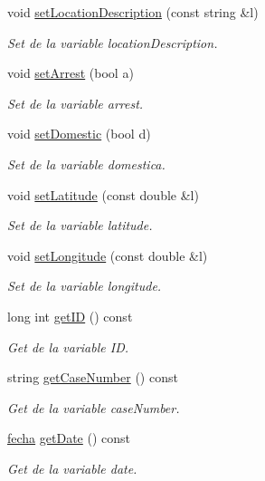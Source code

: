 \begin{DoxyCompactItemize}
void \hyperlink{classcrimen_a83703b5f245751410a3ffafb9f7065c0}{set\-Location\-Description} (const string \&l)
\begin{DoxyCompactList}\small\item\em Set de la variable location\-Description. \end{DoxyCompactList}\item 
void \hyperlink{classcrimen_ae08b85470038469179a01ba753b7641a}{set\-Arrest} (bool a)
\begin{DoxyCompactList}\small\item\em Set de la variable arrest. \end{DoxyCompactList}\item 
void \hyperlink{classcrimen_a3ec14cf4bb0464350d8efd98d2679d41}{set\-Domestic} (bool d)
\begin{DoxyCompactList}\small\item\em Set de la variable domestica. \end{DoxyCompactList}\item 
void \hyperlink{classcrimen_aff1f4343bad1957f290ea25df45878fa}{set\-Latitude} (const double \&l)
\begin{DoxyCompactList}\small\item\em Set de la variable latitude. \end{DoxyCompactList}\item 
void \hyperlink{classcrimen_ab150b316a5f17058f817e3e8908ad821}{set\-Longitude} (const double \&l)
\begin{DoxyCompactList}\small\item\em Set de la variable longitude. \end{DoxyCompactList}\item 
long int \hyperlink{classcrimen_a855eab30a304a6498828cb5d85a4e0e3}{get\-I\-D} () const 
\begin{DoxyCompactList}\small\item\em Get de la variable I\-D. \end{DoxyCompactList}\item 
string \hyperlink{classcrimen_ab3c025eb20cdcea9192ee190fa2af015}{get\-Case\-Number} () const 
\begin{DoxyCompactList}\small\item\em Get de la variable case\-Number. \end{DoxyCompactList}\item 
\hyperlink{classfecha}{fecha} \hyperlink{classcrimen_a8a6712e536211034819441ab87e1c215}{get\-Date} () const 
\begin{DoxyCompactList}\small\item\em Get de la variable date. \end{DoxyCompactList}\item 

\end{DoxyCompactItemize}
